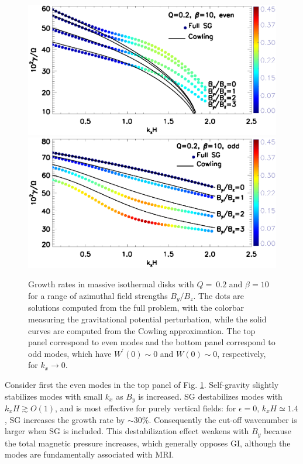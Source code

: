 \begin{figure}
  \includegraphics[width=\linewidth,clip=true,trim=0cm 2cm 0cm 0cm]{figures/compare_growth3_tilted_even.ps} 
  \includegraphics[width=\linewidth,clip=true,trim=0cm 0cm 0cm 0.52cm]{figures/compare_growth3_tilted_odd.ps}
  \caption{Growth rates in massive isothermal disks with $Q=~0.2$ and
    $\beta=10$ for a range of azimuthal field strengths $B_y/B_z$. The
    dots are solutions computed from the full problem, with the
    colorbar measuring the gravitational potential perturbation, while
    the solid curves are computed from the Cowling approximation. The
    top panel correspond to even modes and the
    bottom panel correspond to odd modes, which have
    $W^\prime(0)\sim0$ and $W(0)\sim0$, respectively, for $k_x\to0$.
    \label{compare_growth3_tilted}}
\end{figure}


Consider first the even modes in the top panel of
Fig. \ref{compare_growth3_tilted}. Self-gravity slightly stabilizes
modes with small $k_x$ as $B_y$ is increased. SG destabilizes modes
with  $k_xH\gtrsim O(1)$, and is most effective for purely
vertical fields: for $\epsilon=0,\, k_xH\simeq 1.4$, SG increases the
growth rate by $\sim 30\%$. Consequently the cut-off wavenumber is
larger when SG is included. This destabilization effect weakens with
$B_y$ because the total magnetic pressure increases, which generally
opposes GI, although the modes are fundamentally associated with MRI.  



